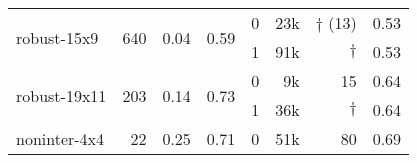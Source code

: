 \begin{table}[t]
{\begin{tabular}{l rcc@{\hskip 12pt}rr@{\hskip 12pt}rr}
\midrule
\multirow{2}{*}{robust-15x9} & \multirow{2}{*}{640} & \multirow{2}{*}{0.04} & \multirow{2}{*}{0.59} & 0 & 23k & $\dagger$ (13) & 0.53  \\
& & & & 1 & 91k & $\dagger$ & 0.53 \\

\midrule
\multirow{2}{*}{robust-19x11} & \multirow{2}{*}{203} & \multirow{2}{*}{0.14} & \multirow{2}{*}{0.73} & 0 & 9k & 15 & 0.64 \\
& & & & 1 & 36k & $\dagger$ & 0.64 \\

\midrule
noninter-4x4 & 22 & 0.25 & 0.71 & 0 & 51k & 80 &  0.69  \\

\bottomrule
\end{tabular}
}
\vspace{-0.5em}
\end{table}